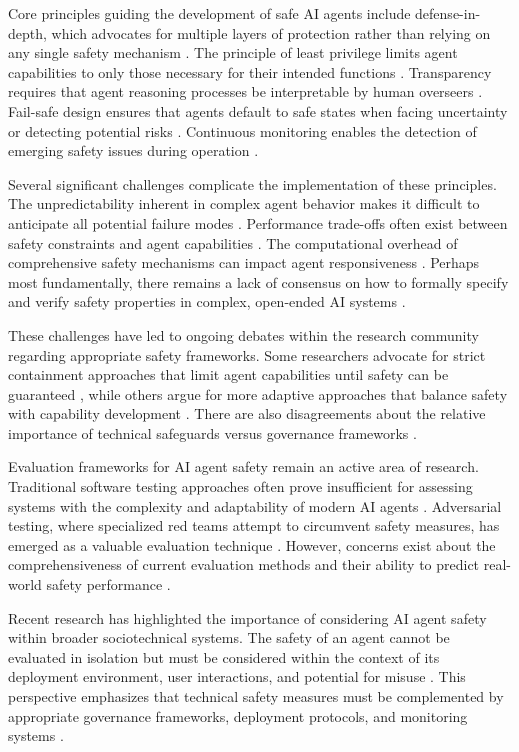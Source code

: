 \documentclass[conference]{IEEEtran}
\begin{document}
Core principles guiding the development of safe AI agents include defense-in-depth, which advocates for multiple layers of protection rather than relying on any single safety mechanism \cite{2408.12935}. The principle of least privilege limits agent capabilities to only those necessary for their intended functions \cite{2406.08689}. Transparency requires that agent reasoning processes be interpretable by human overseers \cite{2408.12935}. Fail-safe design ensures that agents default to safe states when facing uncertainty or detecting potential risks \cite{2202.09292}. Continuous monitoring enables the detection of emerging safety issues during operation \cite{2208.14426}.

Several significant challenges complicate the implementation of these principles. The unpredictability inherent in complex agent behavior makes it difficult to anticipate all potential failure modes \cite{2406.02630}. Performance trade-offs often exist between safety constraints and agent capabilities \cite{2409.03793}. The computational overhead of comprehensive safety mechanisms can impact agent responsiveness \cite{2409.03793}. Perhaps most fundamentally, there remains a lack of consensus on how to formally specify and verify safety properties in complex, open-ended AI systems \cite{2201.10436}.

These challenges have led to ongoing debates within the research community regarding appropriate safety frameworks. Some researchers advocate for strict containment approaches that limit agent capabilities until safety can be guaranteed \cite{2201.10436}, while others argue for more adaptive approaches that balance safety with capability development \cite{2405.06624}. There are also disagreements about the relative importance of technical safeguards versus governance frameworks \cite{2502.14870}.

Evaluation frameworks for AI agent safety remain an active area of research. Traditional software testing approaches often prove insufficient for assessing systems with the complexity and adaptability of modern AI agents \cite{2407.21792}. Adversarial testing, where specialized red teams attempt to circumvent safety measures, has emerged as a valuable evaluation technique \cite{2406.08689}. However, concerns exist about the comprehensiveness of current evaluation methods and their ability to predict real-world safety performance \cite{2407.21792}.

Recent research has highlighted the importance of considering AI agent safety within broader sociotechnical systems. The safety of an agent cannot be evaluated in isolation but must be considered within the context of its deployment environment, user interactions, and potential for misuse \cite{2411.01042}. This perspective emphasizes that technical safety measures must be complemented by appropriate governance frameworks, deployment protocols, and monitoring systems \cite{2408.12935}.
\end{document}
